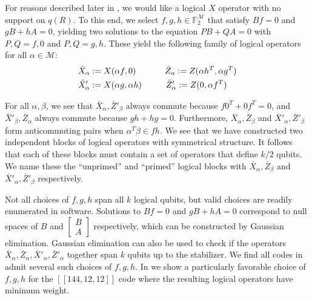\documentclass{article}
\begin{document}
For reasons described later in , we would like a logical $X$ operator with no support on $q(R)$. To this end, we select $f,g,h \in \mathbb{F}_2^{\mathcal{M}}$ that satisfy $Bf = 0$ and $gB + hA = 0$, yielding two solutions to the equation $PB+QA = 0$ with $P,Q = f,0$ and $P,Q = g,h$. These yield the following family of logical operators for all $\alpha \in \mathcal{M}$:
\begin{equation}
\begin{aligned}
	 \bar X_\alpha &:= X(\alpha f,0) \hspace{1.2cm} \bar Z_\alpha := Z(\alpha h^T, \alpha g^T)\\
    \bar X'_\alpha &:= X(\alpha  g, \alpha  h) \hspace{1cm} \bar Z'_\alpha := Z(0, \alpha f^T) 
\end{aligned}\label{eq:logicalpaulis}
\end{equation}

For all $\alpha,\beta $, we see that $\bar X_\alpha, \bar Z'_\beta$ always commute because $f0^T + 0f^T = 0$, and $\bar X'_\beta,\bar Z_\alpha$ always commute because $gh+hg=0$. Furthermore, $\bar X_\alpha, \bar Z_\beta$ and $\bar X'_\alpha, \bar Z'_\beta$ form anticommuting pairs when $\alpha^T\beta \in fh$. We see that we have constructed two independent blocks of logical operators with symmetrical structure. It follows that each of these blocks must contain a set of operators that define $k/2$ qubits. We name these the ``unprimed'' and ``primed'' logical blocks with $\bar X_\alpha, \bar Z_\beta$ and $\bar X'_\alpha, \bar Z'_\beta$ respectively.

Not all choices of $f,g,h$ span all $k$ logical qubits, but valid choices are readily enumerated in software. Solutions to $Bf = 0$ and $gB + hA = 0$ correspond to null spaces of $B$ and $\begin{bmatrix}B \\ A\end{bmatrix}$ respectively, which can be constructed by Gaussian elimination. Gaussian elimination can also be used to check if the operators $\bar X_\alpha, \bar Z_\alpha, \bar X'_\alpha, \bar Z'_\alpha$ together span $k$ qubits up to the stabilizer. We find all codes in  admit several such choices of $f,g,h$. In  we show a particularly favorable choice of $f,g,h$ for the $[[144,12,12]]$ code where the resulting logical operators have minimum weight.

\end{document}
